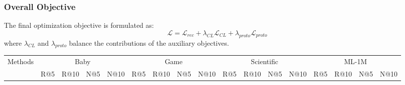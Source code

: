 \documentclass[letterpaper]{article} %
\theoremstyle{definition} %
\begin{document}
\subsubsection{Overall Objective}

The final optimization objective is formulated as:
\begin{equation}
\mathcal{L}
=
\mathcal{L}_{rec}
+
\lambda_{CL}\mathcal{L}_{CL}
+
\lambda_{proto}\mathcal{L}_{proto}
\end{equation}
where $\lambda_{CL}$ and $\lambda_{proto}$ balance the contributions of the auxiliary objectives.

\begin{table}[t]
  \centering
  \small %
  \setlength{\tabcolsep}{0.7mm} %
  \renewcommand{\arraystretch}{1.2}

  \begin{tabular}{@{} l cccc cccc cccc cccc @{}}
    \toprule
    \multirow{2}{*}{Methods} &
    \multicolumn{4}{c}{Baby} &
    \multicolumn{4}{c}{Game} &
    \multicolumn{4}{c}{Scientific} &
    \multicolumn{4}{c}{ML-1M} \\

    \cmidrule(lr){2-5} \cmidrule(lr){6-9} \cmidrule(lr){10-13} \cmidrule(lr){14-17}

     & R@5 & R@10 & N@5 & N@10 & R@5 & R@10 & N@5 & N@10 & R@5 & R@10 & N@5 & N@10 & R@5 & R@10 & N@5 & N@10 \\


\end{tabular}
\end{table}
\end{document}
